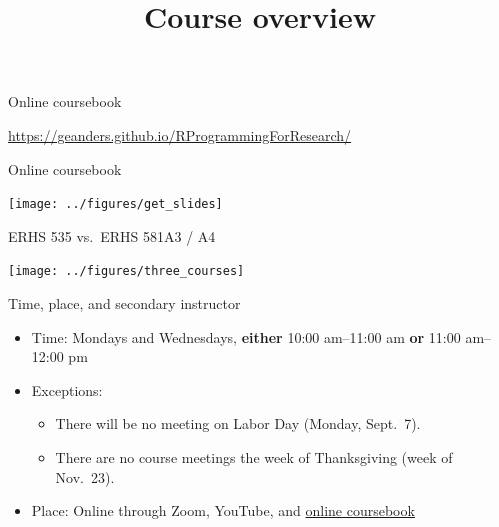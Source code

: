 \documentclass[
  10pt,
  ignorenonframetext,
]{beamer}
\title{Course overview}
\author{}
\date{\vspace{-2.5em}}
\providecommand{\tightlist}{%
  \setlength{\itemsep}{0pt}\setlength{\parskip}{0pt}}
\begin{document}
\frame{\titlepage}

\begin{frame}{Online coursebook}
\protect\hypertarget{online-coursebook}{}

\large

\begin{center}
\href{https://geanders.github.io/RProgrammingForResearch/}{https://geanders.github.io/RProgrammingForResearch/}
\end{center}

\end{frame}

\begin{frame}{Online coursebook}
\protect\hypertarget{online-coursebook-1}{}

\begin{center}\texttt{[image: ../figures/get\_slides]} \end{center}

\end{frame}

\begin{frame}{ERHS 535 vs.~ERHS 581A3 / A4}
\protect\hypertarget{erhs-535-vs.-erhs-581a3-a4}{}

\begin{center}\texttt{[image: ../figures/three\_courses]} \end{center}

\end{frame}

\begin{frame}{Time, place, and secondary instructor}
\protect\hypertarget{time-place-and-secondary-instructor}{}

\begin{itemize}
\tightlist
\item
  Time: Mondays and Wednesdays, \textbf{either} 10:00 am--11:00 am
  \textbf{or} 11:00 am--12:00 pm
\item
  Exceptions:

  \begin{itemize}
  \tightlist
  \item
    There will be no meeting on Labor Day (Monday, Sept.~7).
  \item
    There are no course meetings the week of Thanksgiving (week of
    Nov.~23).
  \end{itemize}
\item
  Place: Online through Zoom, YouTube, and
  \href{https://geanders.github.io/RProgrammingForResearch/}{online
  coursebook}
\end{itemize}

\end{frame}
\end{document}
